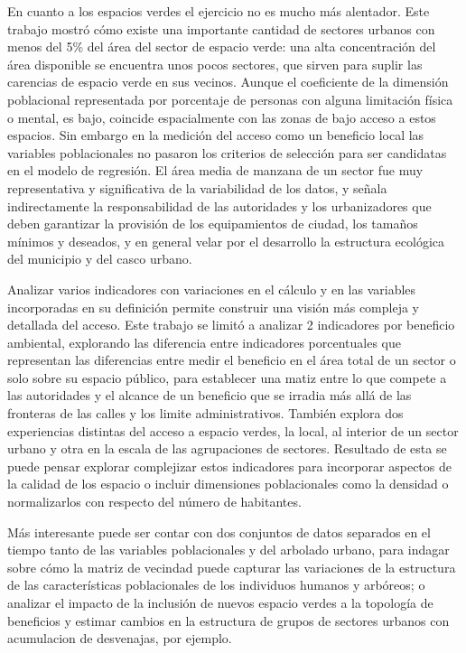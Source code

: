 \documentclass[12pt,]{book}
\begin{document}
En cuanto a los espacios verdes el ejercicio no es mucho más alentador.
Este trabajo mostró cómo existe una importante cantidad de sectores
urbanos con menos del 5\% del área del sector de espacio verde: una alta
concentración del área disponible se encuentra unos pocos sectores, que
sirven para suplir las carencias de espacio verde en sus vecinos. Aunque
el coeficiente de la dimensión poblacional representada por porcentaje
de personas con alguna limitación física o mental, es bajo, coincide
espacialmente con las zonas de bajo acceso a estos espacios. Sin embargo
en la medición del acceso como un beneficio local las variables
poblacionales no pasaron los criterios de selección para ser candidatas
en el modelo de regresión. El área media de manzana de un sector fue muy
representativa y significativa de la variabilidad de los datos, y señala
indirectamente la responsabilidad de las autoridades y los urbanizadores
que deben garantizar la provisión de los equipamientos de ciudad, los
tamaños mínimos y deseados, y en general velar por el desarrollo la
estructura ecológica del municipio y del casco urbano.

Analizar varios indicadores con variaciones en el cálculo y en las
variables incorporadas en su definición permite construir una visión más
compleja y detallada del acceso. Este trabajo se limitó a analizar 2
indicadores por beneficio ambiental, explorando las diferencia entre
indicadores porcentuales que representan las diferencias entre medir el
beneficio en el área total de un sector o solo sobre su espacio público,
para establecer una matiz entre lo que compete a las autoridades y el
alcance de un beneficio que se irradia más allá de las fronteras de las
calles y los limite administrativos. También explora dos experiencias
distintas del acceso a espacio verdes, la local, al interior de un
sector urbano y otra en la escala de las agrupaciones de sectores.
Resultado de esta se puede pensar explorar complejizar estos indicadores
para incorporar aspectos de la calidad de los espacio o incluir
dimensiones poblacionales como la densidad o normalizarlos con respecto
del número de habitantes.

Más interesante puede ser contar con dos conjuntos de datos separados en
el tiempo tanto de las variables poblacionales y del arbolado urbano,
para indagar sobre cómo la matriz de vecindad puede capturar las
variaciones de la estructura de las características poblacionales de los
individuos humanos y arbóreos; o analizar el impacto de la inclusión de
nuevos espacio verdes a la topología de beneficios y estimar cambios en
la estructura de grupos de sectores urbanos con acumulacion de
desvenajas, por ejemplo.
\end{document}
